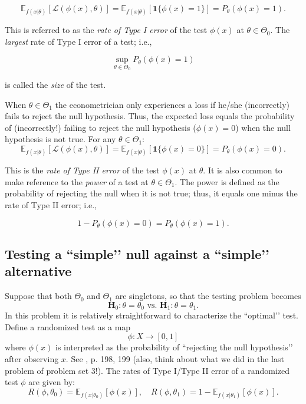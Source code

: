 \documentclass[11pt]{article} %
\begin{document}
\begin{equation} \label{equation:TypeI}
\mathbb{E}_{f(x|\theta)} [  \mathcal{L}(\phi(x),\theta)   ] = \mathbb{E}_{f(x|\theta)} [ \mathbf{1}\{\phi(x)=1\}   ] = P_{\theta}(\phi(x)=1) .
\end{equation}


\noindent This is referred to as the \emph{rate of Type I error} of the test $\phi(x)$ at $\theta \in \Theta_0$. The \emph{largest} rate of Type I error of a test; i.e., 

\[ \sup_{\theta \in \Theta_0} P_{\theta}(\phi(x)=1)  \]  

\noindent is called the \emph{size} of the test.



When $\theta \in \Theta_1$ the econometrician only experiences a loss if he/she (incorrectly) fails to reject the null hypothesis. Thus, the expected loss equals the probability of (incorrectly!) failing to reject the null hypothesis ($\phi(x)=0$) when the null hypothesis is not true. For any $\theta \in \Theta_1$: 
\begin{equation} \label{equation:TypeII}
\mathbb{E}_{f(x|\theta)} [  \mathcal{L}(\phi(x),\theta)   ] = \mathbb{E}_{f(x|\theta)} [ \mathbf{1}\{\phi(x)=0\}   ] = P_{\theta}(\phi(x)=0) .
\end{equation}

\noindent This is the \emph{rate of Type II error} of the test $\phi(x)$ at $\theta$. It is also common to make reference to the \emph{power} of a test at $\theta \in \Theta_1$. The power is defined as the probability of rejecting the null when it is not true; thus, it equals one minus the rate of Type II error; i.e., 

\[ 1- P_{\theta} (\phi(x)=0) = P_{\theta}(\phi(x)=1). \]

\subsection{Testing a ``simple’’ null against a ``simple’’ alternative}

Suppose that both $\Theta_0$ and $\Theta_1$ are singletons, so that the testing problem becomes 
\[ \textbf{H}_0: \theta=\theta_0 \textrm{ vs. }  \textbf{H}_1: \theta=\theta_1. \]
In this problem it is relatively straightforward to characterize the ``optimal’’ test. Define a randomized test as a map 
$$\phi:X \rightarrow [0,1]$$
\noindent where $\phi(x)$ is interpreted as the probability of ``rejecting the null hypothesis’’ after observing $x$. See \cite{Ferguson67}, p. 198, 199 (also, think about what we did in the last problem of problem set 3!). The rates of Type I/Type II error of a randomized test $\phi$ are given by:
\[ R(\phi,\theta_0) = \mathbb{E}_{f(x|\theta_0)}[\phi(x)], \quad R(\phi,\theta_1) = 1-\mathbb{E}_{f(x|\theta_1)}[\phi(x)]. \]
\end{document}
